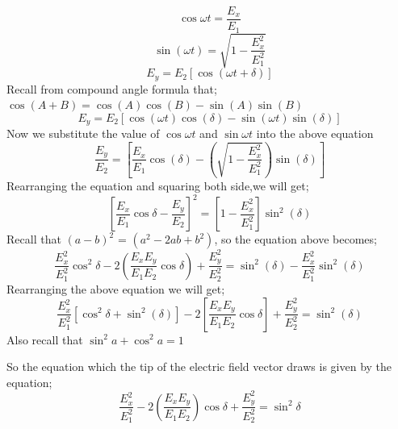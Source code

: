\begin{equation}
\cos{\omega t} = \frac{E_x}{E_1}
\end{equation}
\begin{equation}
\sin (\omega t) = \sqrt{1-\frac{E_{x}^2}{E_{1}^2}}
\end{equation}
\begin{equation}
E_y = E_2 [\cos(\omega t + \delta)]
\end{equation}
Recall from compound angle formula that; $\cos(A+B) = \cos(A)\cos(B) - \sin(A)\sin(B)$ 
\begin{equation}
E_y = E_2 [\cos(\omega t)\cos(\delta) -\sin(\omega t) \sin(\delta)]
\end{equation}
Now we substitute the value of $\cos{\omega t}$ and $\sin{\omega t}$ into the above equation
\begin{equation}
\frac{E_y}{E_2} =[\frac{E_x}{E_1}\cos(\delta)-(\sqrt{1 - \frac{E_{x}^2}{E_{1}^2}})\sin(\delta)]
\end{equation}
Rearranging the equation and squaring both side,we will get;
\begin{equation}
{[\frac{E_x}{E_1}\cos{\delta}-\frac{E_y}{E_2}]}^2 = [1-\frac{E_{x}^2}{E_{1}^2}]\sin^2(\delta)
\end{equation}
Recall that ${(a-b)}^2$ = $(a^2-2ab+b^2)$, so the equation above becomes;
\begin{dmath}
\frac{E_{x}^2}{E_{1}^2}\cos^2{\delta}-2(\frac{E_{x}E_{y}}{E_{1}E_{2}}\cos{\delta}) + \frac{E_{y}^2}{E_{2}^2} = \sin^2(\delta)-\frac{E_{x}^2}{E_{1}^2}\sin^2(\delta)
\end{dmath}
Rearranging the above equation we will get;
\begin{equation}
\frac{E_{x}^2}{E_{1}^2}[\cos^2{\delta} + \sin ^2(\delta)] - 2[\frac{E_{x}E_{y}}{E_{1}E_{2}}\cos{\delta}] + \frac{E_{y}^2}{E_{2}^2} = \sin^2(\delta)
\end{equation}
Also recall that $ \sin^2{a} + \cos^2{a} =  1$

So the equation which the tip of the electric field vector draws is given by the equation;
\begin{equation}
\frac{E_{x}^2}{E_{1}^2} -2(\frac{E_{x}E_{y}}{E_{1}E_{2}})\cos\delta + \frac{E_{y}^2}{E_{2}^2} =\sin^2 \delta
\label{locus of electric field vector}
\end{equation}

